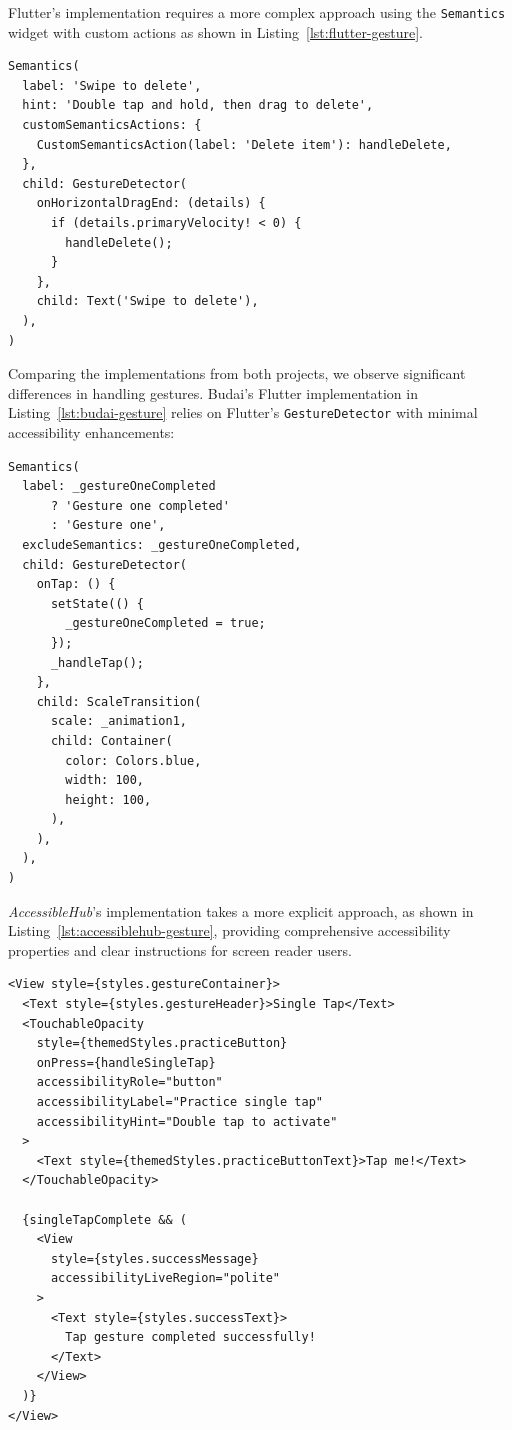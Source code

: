 \FloatBarrier

Flutter's implementation requires a more complex approach using the \texttt{Semantics} widget with custom actions as shown in Listing~\ref{lst:flutter-gesture}.

\begin{lstlisting}[style=DartStyle, caption=Accessible gesture handler in Flutter, label=lst:flutter-gesture]
Semantics(
  label: 'Swipe to delete',
  hint: 'Double tap and hold, then drag to delete',
  customSemanticsActions: {
    CustomSemanticsAction(label: 'Delete item'): handleDelete,
  },
  child: GestureDetector(
    onHorizontalDragEnd: (details) {
      if (details.primaryVelocity! < 0) {
        handleDelete();
      }
    },
    child: Text('Swipe to delete'),
  ),
)
\end{lstlisting}

\pagebreak

Comparing the implementations from both projects, we observe significant differences in handling gestures. Budai's Flutter implementation in Listing~\ref{lst:budai-gesture} relies on Flutter's \texttt{GestureDetector} with minimal accessibility enhancements:

\begin{lstlisting}[style=DartStyle, caption=Gesture handling in Budai's Flutter implementation, label=lst:budai-gesture]
Semantics(
  label: _gestureOneCompleted 
      ? 'Gesture one completed' 
      : 'Gesture one',
  excludeSemantics: _gestureOneCompleted,
  child: GestureDetector(
    onTap: () {
      setState(() {
        _gestureOneCompleted = true;
      });
      _handleTap();
    },
    child: ScaleTransition(
      scale: _animation1,
      child: Container(
        color: Colors.blue,
        width: 100,
        height: 100,
      ),
    ),
  ),
)
\end{lstlisting}

\pagebreak

\textit{AccessibleHub}'s implementation takes a more explicit approach, as shown in Listing~\ref{lst:accessiblehub-gesture}, providing comprehensive accessibility properties and clear instructions for screen reader users.

\begin{lstlisting}[style=ReactNativeStyle, caption=Gesture handling in \textit{AccessibleHub}'s React Native implementation, label=lst:accessiblehub-gesture]
<View style={styles.gestureContainer}>
  <Text style={styles.gestureHeader}>Single Tap</Text>
  <TouchableOpacity
    style={themedStyles.practiceButton}
    onPress={handleSingleTap}
    accessibilityRole="button"
    accessibilityLabel="Practice single tap"
    accessibilityHint="Double tap to activate"
  >
    <Text style={themedStyles.practiceButtonText}>Tap me!</Text>
  </TouchableOpacity>
  
  {singleTapComplete && (
    <View 
      style={styles.successMessage} 
      accessibilityLiveRegion="polite"
    >
      <Text style={styles.successText}>
        Tap gesture completed successfully!
      </Text>
    </View>
  )}
</View>
\end{lstlisting}

